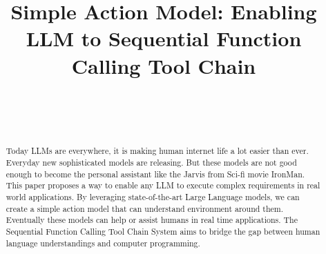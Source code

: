 \documentclass[conference]{IEEEtran}
\begin{document}
\title{Simple Action Model: Enabling LLM to Sequential Function Calling Tool Chain\\
}

\author{

{}

\\


\and


\\


\and






}

\maketitle

\begin{abstract}
 Today LLMs are everywhere, it is making human internet life a lot easier than ever.
Everyday new sophisticated models are releasing. But these models are not good enough to become
the personal assistant like the Jarvis from Sci-fi movie IronMan. This paper proposes
a way to enable any LLM to execute complex requirements in real world applications. By
leveraging state-of-the-art Large Language models, we can create a simple action model that can 
understand environment around them. Eventually these models can help or assist humans in real time applications.
The Sequential Function Calling Tool Chain System
aims to bridge the gap between human language understandings and computer programming.
\end{abstract}
\end{document}
